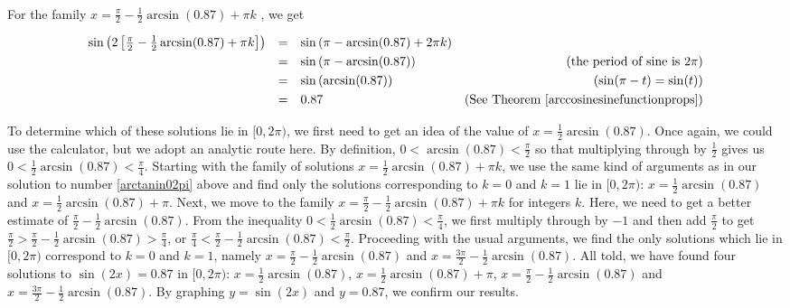 \begin{ex}
\begin{enumerate}
\[\begin{array}{rclr}
\end{array}\] 


For the family $x =\frac{\pi}{2} -  \frac{1}{2}\arcsin(0.87) + \pi k$ , we get

\[ \begin{array}{rclr}

\sin\left(2\left[\frac{\pi}{2} - \frac{1}{2} \arcsin(0.87) + \pi k\right]\right)  &  = & \sin\left(\pi - \arcsin(0.87) + 2\pi k\right) & \\ [3pt]
																												& =  & \sin\left(\pi - \arcsin(0.87)\right) & \text{(the period of sine is $2\pi$)} \\ [3pt]
																												& =  & \sin\left(\arcsin(0.87)\right) & \text{($\sin(\pi - t) = \sin(t)$)} \\ [3pt]
																												& =  & 0.87& (\text{See Theorem } \ref{arccosinesinefunctionprops}) \\
																								
\end{array}\] 

To determine which of these solutions lie in $[0,2\pi)$, we first need to get an idea of the value of $x=\frac{1}{2} \arcsin(0.87)$.  Once again, we could use the calculator, but we adopt an analytic route here.  By definition, $0 < \arcsin(0.87) < \frac{\pi}{2}$ so that multiplying through by $\frac{1}{2}$ gives us $0 < \frac{1}{2} \arcsin(0.87) < \frac{\pi}{4}$.  Starting with the family of solutions $x = \frac{1}{2} \arcsin(0.87) + \pi k$, we use the same kind of arguments as in our solution to number \ref{arctanin02pi} above and find only the solutions corresponding to $k =0$ and $k=1$ lie in $[0,2\pi)$:  $x = \frac{1}{2} \arcsin(0.87)$ and $x = \frac{1}{2} \arcsin(0.87) + \pi$.  Next, we move to the family $x =\frac{\pi}{2} -  \frac{1}{2}\arcsin(0.87) + \pi k$ for integers $k$. Here, we need to get a better estimate of $\frac{\pi}{2} - \frac{1}{2} \arcsin(0.87)$.  From the inequality $0 < \frac{1}{2}\arcsin(0.87) < \frac{\pi}{4}$, we first multiply through by $-1$ and then add $\frac{\pi}{2}$ to get $\frac{\pi}{2} > \frac{\pi}{2} -\frac{1}{2} \arcsin(0.87) >  \frac{\pi}{4}$, or $\frac{\pi}{4} < \frac{\pi}{2} -\frac{1}{2} \arcsin(0.87) < \frac{\pi}{2}$.  Proceeding with the usual arguments, we find the only solutions which lie in $[0,2\pi)$ correspond to $k = 0$ and $k=1$, namely $x =\frac{\pi}{2} -  \frac{1}{2}\arcsin(0.87)$ and  $x = \frac{3\pi}{2} - \frac{1}{2}\arcsin(0.87)$. All told, we have found four solutions to $\sin(2x) = 0.87$ in $[0,2\pi)$:  $x =\frac{1}{2} \arcsin(0.87)$, $x=\frac{1}{2} \arcsin(0.87) + \pi$, $x =\frac{\pi}{2} -  \frac{1}{2}\arcsin(0.87)$ and  $x = \frac{3\pi}{2} - \frac{1}{2}\arcsin(0.87)$. By graphing $y = \sin(2x)$ and $y = 0.87$, we confirm our results.


\end{enumerate}
\end{ex}

